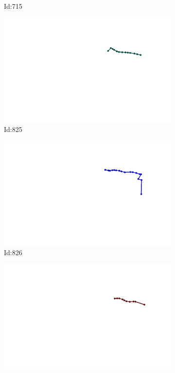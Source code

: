 \documentclass[12pt,twoside]{report}
\begin{document}
\begin{figure}
\begin{subfigure}[b]{0.20\textwidth}
\caption{Id:715}
\end{subfigure}
\begin{subfigure}[b]{0.20\textwidth}
\centering
\includegraphics[width=\textwidth]{../../trajectories/825.png}
\caption{Id:825}
\end{subfigure}
\begin{subfigure}[b]{0.20\textwidth}
\centering
\includegraphics[width=\textwidth]{../../trajectories/826.png}
\caption{Id:826}
\end{subfigure}
\begin{subfigure}[b]{0.20\textwidth}
\centering
\includegraphics[width=\textwidth]{../../trajectories/827.png}

\end{subfigure}
\end{figure}
\end{document}
